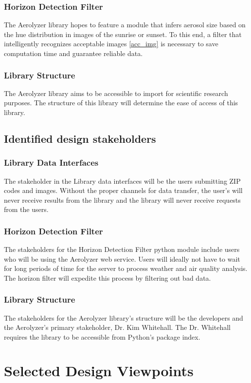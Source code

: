\documentclass[onecolumn, draftclsnofoot,10pt, compsoc]{IEEEtran}
\begin{document}
\begin{singlespace}
        \subsubsection{Horizon Detection Filter}
        The Aerolyzer library hopes to feature a module that infers aerosol size based on the hue distribution in images of the sunrise or sunset. To this end, a filter that intelligently recognizes acceptable images \ref{acc_img} is necessary to save computation time and guarantee reliable data.
        \subsubsection{Library Structure}
        The Aerolyzer library aims to be accessible to import for scientific research purposes. The structure of this library will determine the ease of access of this library.
	\subsection{Identified design stakeholders}
    	\subsubsection{Library Data Interfaces}
        The stakeholder in the Library data interfaces will be the users submitting ZIP codes and images. Without the proper channels for data transfer, the user’s will never receive results from the library and the library will never receive requests from the users.
        \subsubsection{Horizon Detection Filter}
        The stakeholders for the Horizon Detection Filter python module include users who will be using the Aerolyzer web service. Users will ideally not have to wait for long periods of time for the server to process weather and air quality analysis. The horizon filter will expedite this process by filtering out bad data.
        \subsubsection{Library Structure}
        The stakeholders for the Aerolyzer library’s structure will be the developers and the Aerolyzer’s primary stakeholder, Dr. Kim Whitehall. The Dr. Whitehall requires the library to be accessible from Python’s package index.
\section{Selected Design Viewpoints}

\end{singlespace}
\end{document}
